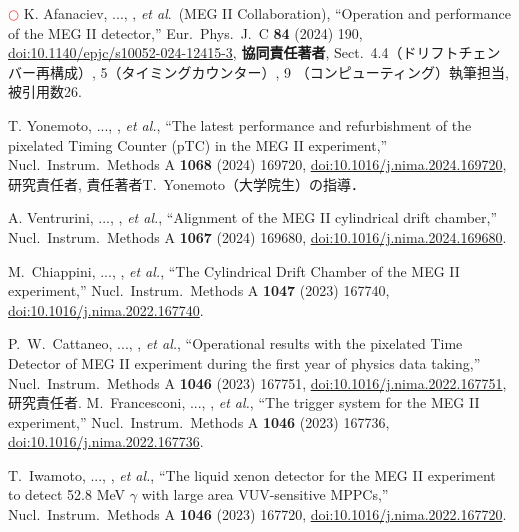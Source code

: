 \begin{enumerate}
\textcolor{red}{$\bigcirc$} 
K. Afanaciev, ..., \me, {\it et al}.\ (MEG II Collaboration),
  ``Operation and performance of the MEG II detector,''
  Eur.\ Phys.\ J.\ C {\bf 84}  (2024) 190,
  \href{https://doi.org/10.1140/epjc/s10052-024-12415-3}{doi:10.1140/epjc/s10052-024-12415-3},
  \textbf{協同責任著者},  Sect.\ 4.4（ドリフトチェンバー再構成）, 5（タイミングカウンター）, 9 （コンピューティング）執筆担当, 被引用数26.

T. Yonemoto, ..., \me, {\it et al.},
``The latest performance and refurbishment of the pixelated Timing Counter (pTC) in the MEG II experiment,'' Nucl.\ Instrum.\ Methods A {\bf 1068} (2024) 169720,
\href{https://doi.org/10.1016/j.nima.2024.169720}{doi:10.1016/j.nima.2024.169720},
研究責任者, 責任著者T.~Yonemoto（大学院生）の指導．

A. Ventrurini, ..., \me, {\it et al.},
``Alignment of the MEG II cylindrical drift chamber,'' Nucl.\ Instrum.\ Methods A {\bf 1067} (2024) 169680,
\href{https://doi.org/10.1016/j.nima.2024.169680}{doi:10.1016/j.nima.2024.169680}.

M.~Chiappini, ..., \me, {\it et al.},
``The Cylindrical Drift Chamber of the MEG II experiment,'' Nucl.\ Instrum.\ Methods A {\bf 1047} (2023) 167740,
\href{https://doi.org/10.1016/j.nima.2022.167740}{doi:10.1016/j.nima.2022.167740}.

P.~W.~Cattaneo, ..., \me, {\it et al.},
``Operational results with the pixelated Time Detector of MEG II experiment during the first year of physics data taking,'' Nucl.\ Instrum.\ Methods A {\bf 1046} (2023) 167751,
\href{https://doi.org/10.1016/j.nima.2022.167751}{doi:10.1016/j.nima.2022.167751},
研究責任者.
M.~Francesconi, ..., \me, {\it et al.},
``The trigger system for the MEG II experiment,'' Nucl.\ Instrum.\ Methods A {\bf 1046} (2023) 167736,
\href{https://doi.org/10.1016/j.nima.2022.167736}{doi:10.1016/j.nima.2022.167736}.

T.~Iwamoto, ..., \me, {\it et al.},
``The liquid xenon detector for the MEG II experiment to detect 52.8 MeV $\gamma$ with large area VUV-sensitive MPPCs,'' Nucl.\ Instrum.\ Methods A {\bf 1046} (2023) 167720,
\href{https://doi.org/10.1016/j.nima.2022.167720}{doi:10.1016/j.nima.2022.167720}.




\end{enumerate}
